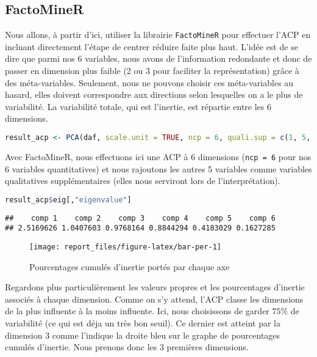 \documentclass[
  11pt,
  xcolor = usenames,dvipsnames]{article}
\newcommand{\passthrough}[1]{#1}
\begin{document}
\hypertarget{factominer}{%
\subsection{FactoMineR}\label{factominer}}

Nous allons, à partir d'ici, utiliser la librairie \passthrough{\lstinline!FactoMineR!} pour effectuer l'ACP en incluant directement l'étape de centrer réduire faite plus haut.
L'idée est de se dire que parmi nos 6 variables, nous avons de l'information redondante et donc de passer en dimension plus faible
(2 ou 3 pour faciliter la représentation) grâce à des méta-variables. Seulement, nous ne pouvons choisir ces méta-variables au hasard,
elles doivent correspondre aux directions selon lesquelles on a le plus de variabilité. La variabilité totale, qui est l'inertie,
est répartie entre les 6 dimensions.

\begin{lstlisting}[language=R]
result_acp <- PCA(daf, scale.unit = TRUE, ncp = 6, quali.sup = c(1, 5, 6, 9, 11), graph = FALSE)
\end{lstlisting}

Avec FactoMineR, nous effectuons ici une ACP à 6 dimensions (\passthrough{\lstinline!ncp = 6!} pour nos 6 variables quantitatives) et
nous rajoutons les autres 5 variables comme variables qualitatives supplémentaires
(elles nous serviront lors de l'interprétation).

\begin{lstlisting}[language=R]
result_acp$eig[,"eigenvalue"]
\end{lstlisting}

\begin{lstlisting}
##    comp 1    comp 2    comp 3    comp 4    comp 5    comp 6 
## 2.5169626 1.0407603 0.9768164 0.8844294 0.4183029 0.1627285
\end{lstlisting}

\begin{figure}

{\centering \texttt{[image: report\_files/figure-latex/bar-per-1]} 

}

\caption{Pourcentages cumulés d'inertie portés par chaque axe}\label{fig:bar-per}
\end{figure}

Regardons plus particulièrement les valeurs propres et les pourcentages d'inertie associés à chaque dimension.
Comme on s'y attend, l'ACP classe les dimensions de la plus influente à la moins influente.
Ici, nous choisissons de garder \(75\%\) de variabilité (ce qui est déja un très bon seuil).
Ce dernier est atteint par la dimension 3 comme l'indique la droite bleu sur le graphe de pourcentages cumulés d'inertie.
Nous prenons donc les 3 premières dimensions.
\end{document}
